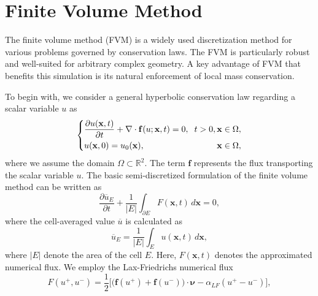 
\section{Finite Volume Method}
The finite volume method (FVM) is a widely used discretization method for
various problems governed by conservation laws.
The FVM is particularly robust and well-suited for  
arbitrary complex geometry. 
A key advantage of FVM that benefits this simulation is
its natural enforcement of local mass conservation.

To begin with, we consider a general hyperbolic conservation law 
regarding a scalar variable $u$ as
\begin{equation}\label{eq:conservationlaw}
		  \left \{
		  \begin{alignedat}{2}
					 &\frac{\partial u(\mathbf{x},t)}{\partial t} + \nabla \cdot \mathbf{f}(u; \mathbf{x},t) = 0, \hspace{0.2cm} t>0,\, &&\mathbf{x} \in \Omega, \\ 
					 &u(\mathbf{x},0) = u_0(\mathbf{x}), \hspace{2.5cm} &&\mathbf{x} \in \Omega,
		  \end{alignedat}
		  \right .
\end{equation}
where we assume the domain $\Omega \subset \mathbb{R}^2$. The term $\mathbf{f}$ represents
the flux transporting the scalar variable $u$.
The basic semi-discretized formulation of the finite volume method can be written as
\begin{equation}
		  \frac{\partial \overline{u}_E}{\partial t} + \frac{1}{\lvert E \rvert}\int_{\partial E} F(\mathbf{x},t)\, d\mathbf{x} = 0,
\end{equation}
where the cell-averaged value $\overline{u}$ is calculated as
\begin{equation}\label{eq:cellaveval}
\overline{u}_E = \frac{1}{\lvert E \rvert} \int_{E} u(\mathbf{x}, t)\, 
		  d\mathbf{x},
\end{equation}
where $\lvert E \rvert$ denote the area of the cell $E$.
Here, $F(\mathbf{x},t)$ denotes the approximated numerical flux. 
We employ the Lax-Friedrichs numerical flux
\begin{equation}\label{eq:LFflux}
		  F(u^+, u^-) = \frac{1}{2}\Big[\big(\mathbf{f}(u^+)+\mathbf{f}(u^-)\big)\cdot \pmb{\nu} - \alpha_{LF}(u^+-u^-)\Big],
\end{equation}
